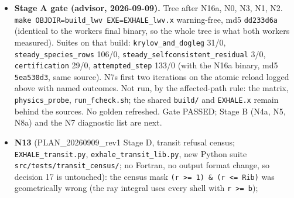 \documentclass[english,a4paper]{my_memo}
\begin{document}
\begin{itemize}
  bitwise). \textbf{\texttt{wasp\_full\_newton}} (once, final binary): not bitwise,
  largest relative movement 2.1e-10 (\texttt{Ion\_species.txt}, Ca I) and 8.8e-11
  (\texttt{Hydro\_ioniz.txt}), \texttt{info\ =\ 0}, \texttt{log10\ Mdot} 13.30; by code path the
  \texttt{hypot} rotation of N3 (\texttt{use\_tr} is false there); below the 0.1\% rule,
  identical, no refresh. \texttt{lower\_profile} (the only default case with
  \texttt{He\_metal\_diffusion} and a partial reservoir) bitwise to its golden in
  both builds (it stops at its marching cap). Other suites (worker):
  \texttt{steady\_species\_rows} 106/0, \texttt{certification} 29/0,
  \texttt{steady\_selfconsistent\_residual} 3/0; \texttt{physics\_probe} does not include
  \texttt{steady\_newton} (\texttt{source\_closure.py}). \textbf{Reported, not fixed}:
  \texttt{largest\_step\_inside\_the\_species\_box} still annihilates a whole direction
  when any unheld unknown has no room on the side the direction points (an
  element physically zero in one cell can trigger it; the outcome is now
  named and the radius survives, the direction is lost): an active-set rule
  decision, for N4b. Two dead locals removed from \texttt{pgmres}.
\item
  \textbf{Stage A gate (advisor, 2026-09-09).} Tree after N16a, N0, N3, N1, N2.
  \texttt{make\ OBJDIR=build\_lwv\ EXE=EXHALE\_lwv.x} warning-free, md5 \texttt{dd233d6a}
  (identical to the worker\textquotesingle s final binary, so the whole tree is what both
  workers measured). Suites on that build: \texttt{krylov\_and\_dogleg} 31/0,
  \texttt{steady\_species\_rows} 106/0, \texttt{steady\_selfconsistent\_residual} 3/0,
  \texttt{certification} 29/0, \texttt{attempted\_step} 133/0 (with the N16a binary, md5
  \texttt{5ea530d3}, same source). N7\textquotesingle s first two iterations on the atomic reload
  logged above with named outcomes. Not run, by the affected-path rule: the
  matrix, \texttt{physics\_probe}, \texttt{run\_fcheck.sh}; the shared \texttt{build/} and
  \texttt{EXHALE.x} remain behind the sources. No golden refreshed. Gate PASSED;
  Stage B (N4a, N5, N8a) and the N7 diagnostic list are next.
\item
  \textbf{N13} (PLAN\_20260909\_rev1 Stage D, transit refusal census;
  \texttt{EXHALE\_transit.py}, \texttt{exhale\_transit\_lib.py}, new Python suite
  \texttt{src/tests/transit\_census/}; no Fortran, no output format change, so
  decision 17 is untouched): the census mask \texttt{(r\ \textgreater{}=\ 1)\ \&\ (r\ \textless{}=\ Rib)} was
  geometrically wrong (the ray integral uses every shell with \texttt{\textbar{}r\textbar{}\ \textgreater{}=\ b});

\end{itemize}
\end{document}
